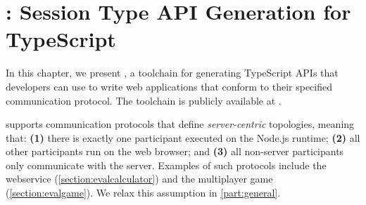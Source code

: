 \chapter{: Session Type API Generation for TypeScript}
\label{chap:codegen}

In this chapter, we present
,
a toolchain for generating TypeScript APIs that developers can
use to write web applications that conform to their specified
communication protocol.
The toolchain is publicly available at \cite{repo}.

 supports communication protocols that define 
\emph{server-centric} topologies, meaning that: 
\textbf{(1)} there is exactly one participant executed on the 
Node.js runtime; 
\textbf{(2)} all other participants run on the web browser; and
\textbf{(3)} all non-server participants only communicate with the server.
Examples of such protocols include the  webservice
(\cref{section:evalcalculator}) and the 
multiplayer game (\cref{section:evalgame}).
We relax this assumption in \cref{part:general}.






